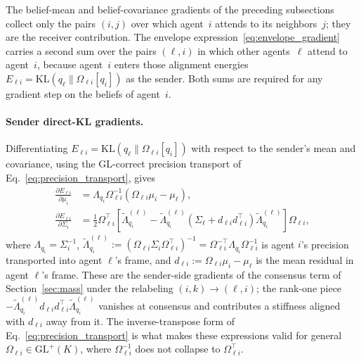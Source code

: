 \documentclass[11pt]{article}
\begin{document}
The belief-mean and belief-covariance gradients of the preceding subsections collect only the pairs $(i,j)$ over which agent~$i$ attends to its neighbors~$j$; they are the receiver contribution. The envelope expression~\eqref{eq:envelope_gradient} carries a second sum over the pairs $(\ell, i)$ in which other agents~$\ell$ attend to agent~$i$, because agent~$i$ enters those alignment energies $E_{\ell i} = \mathrm{KL}(q_\ell \| \Omega_{\ell i}[q_i])$ as the sender. Both sums are required for any gradient step on the beliefs of agent~$i$.

\paragraph{Sender direct-KL gradients.}
Differentiating $E_{\ell i} = \mathrm{KL}(q_\ell \| \Omega_{\ell i}[q_i])$ with respect to the sender's mean and covariance, using the GL-correct precision transport of Eq.~\eqref{eq:precision_transport}, gives
\begin{align}
\frac{\partial E_{\ell i}}{\partial \mu_i} &= \Lambda_{q_i}\Omega_{\ell i}^{-1}\left(\Omega_{\ell i}\mu_i - \mu_\ell\right), \\
\frac{\partial E_{\ell i}}{\partial \Sigma_i} &= \frac{1}{2}\Omega_{\ell i}^{\top}\left[\tilde{\Lambda}_{q_i}^{(\ell)} - \tilde{\Lambda}_{q_i}^{(\ell)}\left(\Sigma_\ell + d_{\ell i}d_{\ell i}^{\top}\right)\tilde{\Lambda}_{q_i}^{(\ell)}\right]\Omega_{\ell i},
\end{align}
where $\Lambda_{q_i} = \Sigma_i^{-1}$, $\tilde{\Lambda}_{q_i}^{(\ell)} := (\Omega_{\ell i}\Sigma_i\Omega_{\ell i}^{\top})^{-1} = \Omega_{\ell i}^{-\top}\Lambda_{q_i}\Omega_{\ell i}^{-1}$ is agent $i$'s precision transported into agent $\ell$'s frame, and $d_{\ell i} := \Omega_{\ell i}\mu_i - \mu_\ell$ is the mean residual in agent $\ell$'s frame. These are the sender-side gradients of the consensus term of Section~\ref{sec:mass} under the relabeling $(i,k) \to (\ell, i)$; the rank-one piece $-\tilde{\Lambda}_{q_i}^{(\ell)}d_{\ell i}d_{\ell i}^{\top}\tilde{\Lambda}_{q_i}^{(\ell)}$ vanishes at consensus and contributes a stiffness aligned with $d_{\ell i}$ away from it. The inverse-transpose form of Eq.~\eqref{eq:precision_transport} is what makes these expressions valid for general $\Omega_{\ell i} \in \mathrm{GL}^{+}(K)$, where $\Omega_{\ell i}^{-1}$ does not collapse to $\Omega_{\ell i}^{\top}$.
\end{document}
